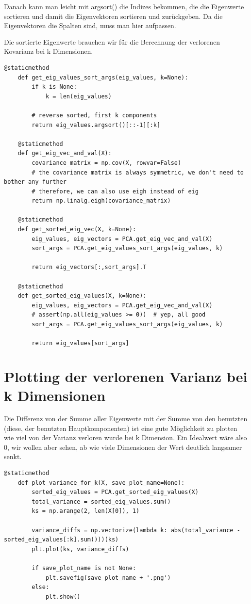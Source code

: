 Danach kann man leicht mit argsort() die Indizes bekommen, die die Eigenwerte sortieren und damit die
Eigenvektoren sortieren und zurückgeben. Da die Eigenvektoren die Spalten sind, muss man hier aufpassen.

Die sortierte Eigenwerte brauchen wir für die Berechnung der verlorenen Kovarianz bei k Dimensionen.

\begin{lstlisting}[style=py]
@staticmethod
    def get_eig_values_sort_args(eig_values, k=None):
        if k is None:
            k = len(eig_values)

        # reverse sorted, first k components
        return eig_values.argsort()[::-1][:k]

    @staticmethod
    def get_eig_vec_and_val(X):
        covariance_matrix = np.cov(X, rowvar=False)
        # the covariance matrix is always symmetric, we don't need to bother any further
        # therefore, we can also use eigh instead of eig
        return np.linalg.eigh(covariance_matrix)

    @staticmethod
    def get_sorted_eig_vec(X, k=None):
        eig_values, eig_vectors = PCA.get_eig_vec_and_val(X)
        sort_args = PCA.get_eig_values_sort_args(eig_values, k)

        return eig_vectors[:,sort_args].T

    @staticmethod
    def get_sorted_eig_values(X, k=None):
        eig_values, eig_vectors = PCA.get_eig_vec_and_val(X)
        # assert(np.all(eig_values >= 0))  # yep, all good
        sort_args = PCA.get_eig_values_sort_args(eig_values, k)

        return eig_values[sort_args]
\end{lstlisting}

\section*{Plotting der verlorenen Varianz bei k Dimensionen}

Die Differenz von der Summe aller Eigenwerte mit der Summe von den benutzten (diese, der benutzten Hauptkomponenten) ist
eine gute Möglichkeit zu plotten wie viel von der Varianz verloren wurde bei k Dimension. Ein Idealwert wäre also 0,
wir wollen aber sehen, ab wie viele Dimensionen der Wert deutlich langsamer senkt.

\begin{lstlisting}[style=py]
@staticmethod
    def plot_variance_for_k(X, save_plot_name=None):
        sorted_eig_values = PCA.get_sorted_eig_values(X)
        total_variance = sorted_eig_values.sum()
        ks = np.arange(2, len(X[0]), 1)

        variance_diffs = np.vectorize(lambda k: abs(total_variance - sorted_eig_values[:k].sum()))(ks)
        plt.plot(ks, variance_diffs)

        if save_plot_name is not None:
            plt.savefig(save_plot_name + '.png')
        else:
            plt.show()
\end{lstlisting}

